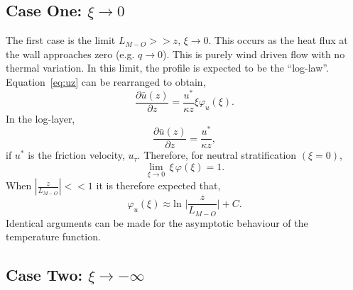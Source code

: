 %

\subsection*{Case One: $\xi \to 0$}
The first case is the limit
$L_{M-O}>>z$, $\xi \to 0$. This occurs as the heat flux
at the wall approaches zero (e.g. $q \to 0$). 
This is purely wind driven flow with no thermal variation. 
In this limit, the profile is expected to be the ``log-law''. 
Equation~\ref{eq:uz} can be rearranged to obtain, 
\begin{equation}
 \frac{\partial \bar u(z)}{\partial z} = \frac{u^*}{\kappa z} \xi \varphi_u(\xi).
\end{equation}
In the log-layer, 
\begin{equation}
 \frac{\partial \bar u(z)}{\partial z} = \frac{u^*}{\kappa z},
\end{equation}
if $u^*$ is the friction velocity, $u_{\tau}$. 
Therefore, for neutral stratification $(\xi = 0)$, 
\begin{equation}
 \lim_{\xi \to 0} \, \xi \, \varphi(\xi)= 1. 
\end{equation}
When $ |\frac{z}{L_{M-O}}| << 1$ it is therefore expected that,
\begin{equation}
 \varphi_u(\xi) \approx \text{ln } \rvert \frac{z}{L_{M-O}} \rvert + C.
\end{equation}
Identical arguments can be made for the asymptotic 
behaviour of the temperature function.

\subsection*{Case Two: $\xi \to -\infty$}

